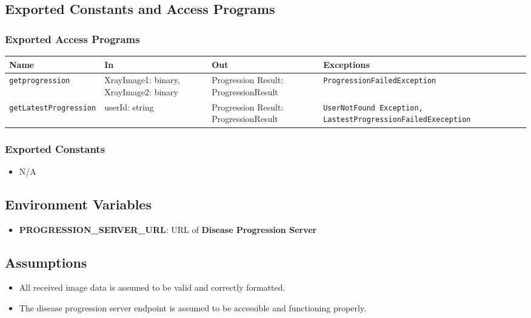 \documentclass[12pt, titlepage]{article}
\begin{document}
\subsection{Exported Constants and Access Programs}
\subsubsection{Exported Access Programs}
\begin{center}
  \begin{tabular}{|p{4.5cm}|p{2.5cm}|p{3.5cm}|p{6cm}|}
    \hline
    \textbf{Name} & \textbf{In} & \textbf{Out} & \textbf{Exceptions} \\
    \hline
    \texttt{getprogression} & XrayImage1: binary, \newline XrayImage2: binary & Progression Result: \newline ProgressionResult & \texttt{ProgressionFailedException} \\
    \hline
    \texttt{getLatestProgression} & userId: string & Progression Result: \newline ProgressionResult & \texttt{UserNotFound Exception, LastestProgressionFailedExeception} \\
    \hline
  \end{tabular}
\end{center}

\subsubsection{Exported Constants}
\begin{itemize}
    \item N/A
\end{itemize}

\subsection{Environment Variables}
\begin{itemize}
  \item \textbf{PROGRESSION\_SERVER\_URL}: URL of \textbf{Disease Progression Server}

\end{itemize}

\subsection{Assumptions}
\begin{itemize}
    \item All received image data is assumed to be valid and correctly formatted.
    \item The disease progression server endpoint is assumed to be accessible and functioning properly.
\end{itemize}
\end{document}
